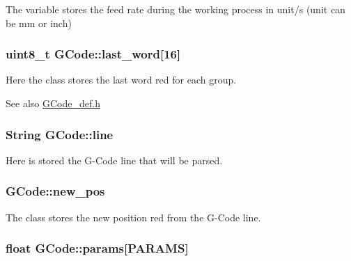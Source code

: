 The variable stores the feed rate during the working process in unit/s (unit can be mm or inch) 

\hypertarget{class_g_code_a3674417ee3c5141c6655c05f6ffa0799}{
\subsubsection[{last\+\_\+word}]{\setlength{\rightskip}{0pt plus 5cm}uint8\+\_\+t G\+Code\+::last\+\_\+word\mbox{[}16\mbox{]}}}\label{class_g_code_a3674417ee3c5141c6655c05f6ffa0799}


Here the class stores the last word red for each group. 

\begin{DoxySeeAlso}{See also}
\hyperlink{_g_code__def_8h}{G\+Code\+\_\+def.\+h} 
\end{DoxySeeAlso}
\hypertarget{class_g_code_a20d7c90740e9e139b24f68336ad8c8f1}{
\subsubsection[{line}]{\setlength{\rightskip}{0pt plus 5cm}String G\+Code\+::line}}\label{class_g_code_a20d7c90740e9e139b24f68336ad8c8f1}


Here is stored the G-\/\+Code line that will be parsed. 

\hypertarget{class_g_code_aadec9af8923a5dc95f9f7da8bccfc109}{
\subsubsection[{new\+\_\+pos}]{ G\+Code\+::new\+\_\+pos}}\label{class_g_code_aadec9af8923a5dc95f9f7da8bccfc109}


The class stores the new position red from the G-\/\+Code line. 

\hypertarget{class_g_code_a6f38c9dddbd7c12c786c6363fd2a369c}{
\subsubsection[{params}]{\setlength{\rightskip}{0pt plus 5cm}float G\+Code\+::params\mbox{[}{\bf P\+A\+R\+A\+M\+S}\mbox{]}}}\label{class_g_code_a6f38c9dddbd7c12c786c6363fd2a369c}


